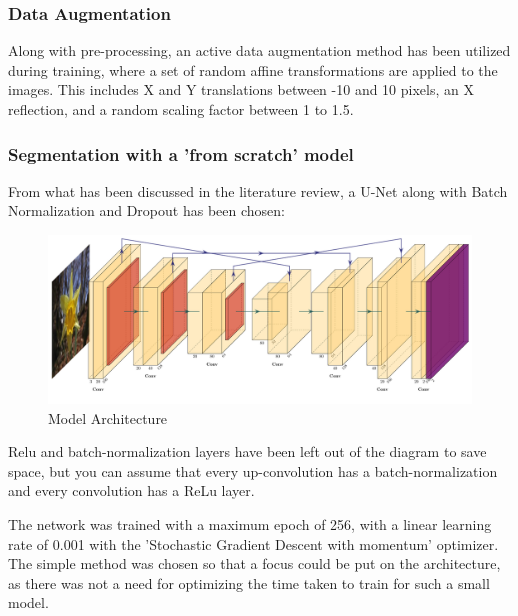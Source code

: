 \documentclass{article}
\begin{document}
\subsubsection{Data Augmentation}

Along with pre-processing, an active data augmentation method has been utilized during training, where a set of random affine transformations are applied to the images. This includes X and Y translations between -10 and 10 pixels, an X reflection, and a random scaling factor between 1 to 1.5.

\subsubsection{Segmentation with a 'from scratch' model}

From what has been discussed in the literature review, a U-Net along with Batch Normalization and Dropout has been chosen:

\begin{figure}[H]
    \includegraphics[width=\linewidth]{unet.pdf}
    \caption{Model Architecture}
\end{figure}

Relu and batch-normalization layers have been left out of the diagram to save space, but you can assume that every up-convolution has a batch-normalization and every convolution has a ReLu layer. 

The network was trained with a maximum epoch of 256, with a linear learning rate of 0.001 with the 'Stochastic Gradient Descent with momentum' optimizer. The simple method was chosen so that a focus could be put on the architecture, as there was not a need for optimizing the time taken to train for such a small model.
\end{document}

